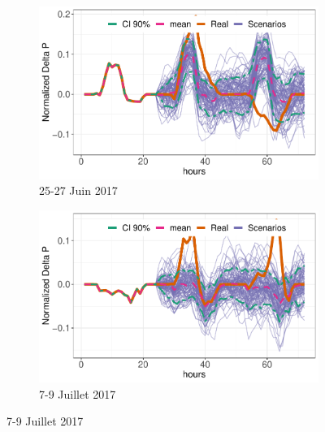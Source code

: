 \documentclass[12pt, french]{report}
\begin{document}
\begin{figure}[htbp]
 	\begin{center}
 		
 		\begin{subfigure}[b]{0.5\linewidth}
 			\centering
 			\includegraphics[width = 0.9 \linewidth]{Images/PV/SARIMA/175.pdf}
 			\caption{25-27 Juin 2017}
 		\end{subfigure}%
 		\begin{subfigure}[b]{0.5\linewidth}
 			\centering
 			\includegraphics[width = 0.9 \linewidth]{Images/PV/SARIMA/187.pdf}
 			\caption{7-9 Juillet 2017}
 		\end{subfigure}
 		

\end{center}
\end{figure}
\end{document}
